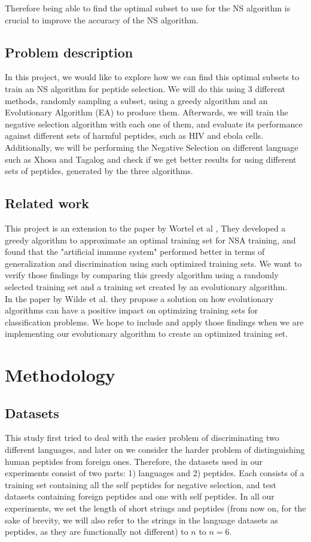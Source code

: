 \documentclass{article}
\begin{document}
Therefore being able to find the optimal subset to use for the NS algorithm is crucial to improve the accuracy of the 
NS algorithm.  

\subsection{Problem description}

In this project, we would like to explore how we can find this optimal subsets to train an NS algorithm for peptide 
selection. We will do this using 3 different methods, randomly sampling a subset, using a greedy algorithm and an 
Evolutionary Algorithm (EA) to produce them. Afterwards, we will train the negative selection algorithm with each one of
them, and evaluate its performance against different sets of harmful peptides, such as HIV and ebola cells. Additionally,
we will be performing the Negative Selection on different language such as Xhosa and Tagalog and check if we get better 
results for using different sets of peptides, generated by the three algorithms. 

\subsection{Related work}
This project is an extension to the paper by Wortel et al \cite{wortel2020t}, They developed a greedy algorithm to 
approximate an optimal training set for NSA training, and found that the "artificial immune system" performed better in 
terms of generalization and discrimination using such optimized training sets. We want to verify those findings by 
comparing this greedy algorithm using a randomly selected training set and a training set created by an evolutionary 
algorithm.\\

In the paper by Wilde et al. \cite{wilde2020evolutionary} they propose a solution on how evolutionary algorithms can 
have a positive impact on optimizing training sets for classification problems.
We hope to include and apply those findings when we are implementing our evolutionary algorithm to create an 
optimized training set.

\section{Methodology}
\subsection{Datasets} \label{datasets}
This study first tried to deal with the easier problem of discriminating two different languages, and later on we 
consider the harder problem of distinguishing human peptides from foreign ones. Therefore, the datasets used in our 
experiments consist of two parts: 1) languages and 2) peptides. Each consists of a training set containing all the self 
peptides for negative selection, and test datasets containing foreign peptides and one with self peptides. In all our 
experiments, we set the length of short strings and peptides (from now on, for the sake of brevity, we will also refer 
to the strings in the language datasets as peptides, as they are functionally not different) to $n$ to $n=6$.
\end{document}
